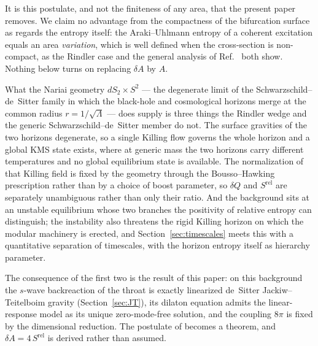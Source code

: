 \documentclass[11pt]{article}
\newcommand{\Srel}{S^{\mathrm{rel}}}
\newcommand{\Nariai}{Nariai}
\begin{document}
It is this postulate, and not the finiteness of any area, that the present paper removes. We claim no advantage from the compactness of the bifurcation surface as regards the entropy itself: the Araki--Uhlmann entropy of a coherent excitation equals an area \emph{variation}, which is well defined when the cross-section is non-compact, as the Rindler case and the general analysis of Ref.~\cite{DAngelo} both show. Nothing below turns on replacing $\delta A$ by $A$.

What the \Nariai{} geometry $dS_2 \times S^2$ --- the degenerate limit of the Schwarzschild--de~Sitter family in which the black-hole and cosmological horizons merge at the common radius $r = 1/\sqrt{\Lambda}$ \cite{Nariai} --- does supply is three things the Rindler wedge and the generic Schwarzschild--de~Sitter member do not. The surface gravities of the two horizons degenerate, so a single Killing flow governs the whole horizon and a global KMS state exists, where at generic mass the two horizons carry different temperatures and no global equilibrium state is available. The normalization of that Killing field is fixed by the geometry through the Bousso--Hawking prescription \cite{BoussoHawking} rather than by a choice of boost parameter, so $\delta Q$ and $\Srel$ are separately unambiguous rather than only their ratio. And the background sits at an unstable equilibrium whose two branches the positivity of relative entropy can distinguish; the instability also threatens the rigid Killing horizon on which the modular machinery is erected, and Section~\ref{sec:timescales} meets this with a quantitative separation of timescales, with the horizon entropy itself as hierarchy parameter.

The consequence of the first two is the result of this paper: on this background the $s$-wave backreaction of the throat is exactly linearized de~Sitter Jackiw--Teitelboim gravity (Section~\ref{sec:JT}), its dilaton equation admits the linear-response model as its unique zero-mode-free solution, and the coupling $8\pi$ is fixed by the dimensional reduction. The postulate of \cite{DorauMuch} becomes a theorem, and $\delta A = 4\,\Srel$ is derived rather than assumed.
\end{document}
